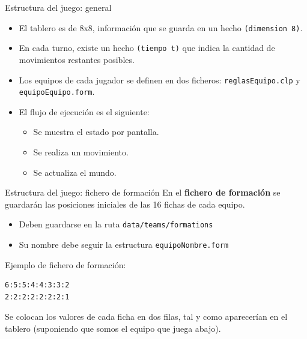 \documentclass[smaller,spanish,xcolor=svgnames]{beamer}
\begin{document}
\begin{frame}{Estructura del juego: general}
  \begin{itemize}
  \item El tablero es de 8x8, información que se guarda en un hecho \texttt{(dimension 8)}.
  \item En cada turno, existe un hecho \texttt{(tiempo t)} que indica la
    cantidad de movimientos restantes posibles.
  \item Los equipos de cada jugador se definen en dos ficheros: \texttt{reglasEquipo.clp} y \texttt{equipoEquipo.form}.
  \item El flujo de ejecución es el siguiente:
    \begin{itemize}
    \item Se muestra el estado por pantalla.
    \item Se realiza un movimiento.
    \item Se actualiza el mundo.
    \end{itemize}
  \end{itemize}  
\end{frame}

\begin{frame}[fragile]{Estructura del juego: fichero de formación}
  En el \textbf{fichero de formación} se guardarán las posiciones iniciales de
  las 16 fichas de cada equipo.
  \begin{itemize}
  \item Deben guardarse en la ruta \texttt{data/teams/formations}
  \item Su nombre debe seguir la estructura \texttt{equipoNombre.form}
  \end{itemize}

  \medskip

  Ejemplo de fichero de formación:

\begin{verbatim}
6:5:5:4:4:3:3:2
2:2:2:2:2:2:2:1
\end{verbatim}

\medskip

Se colocan los valores de cada ficha en dos filas, tal y como aparecerían en el
tablero (suponiendo que somos el equipo que juega abajo).
\end{frame}
\end{document}

